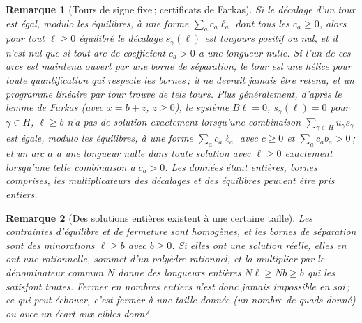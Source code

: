 \documentclass[11pt,a4paper]{article}
\newtheorem{remark}{Remarque}
\newcommand{\shift}{s}
\begin{document}
\begin{remark}[Tours de signe fixe\,; certificats de Farkas]\label{rem:definite}
Si le décalage d'un tour est égal, modulo les équilibres, à une forme $\sum_a
c_a \ell_a$ dont tous les $c_a \ge 0$, alors pour tout $\ell \ge 0$ équilibré
le décalage $\shift_\gamma(\ell)$ est toujours positif ou nul, et il n'est nul
que si tout arc de coefficient $c_a > 0$ a une longueur nulle. Si l'un de ces
arcs est maintenu ouvert par une borne de séparation, le tour est une hélice
pour toute quantification qui respecte les bornes\,; il ne devrait jamais être
retenu, et un programme linéaire par tour trouve de tels tours. Plus
généralement, d'après le lemme de Farkas (avec $x = b + z$, $z \ge 0$), le
système $B\ell = 0$, $\shift_\gamma(\ell) = 0$ pour $\gamma \in H$, $\ell \ge
b$ n'a pas de solution exactement lorsqu'une combinaison $\sum_{\gamma \in H}
u_\gamma \shift_\gamma$ est égale, modulo les équilibres, à une forme $\sum_a
c_a \ell_a$ avec $c \ge 0$ et $\sum_a c_a b_a > 0$\,; et un arc $a$ a une
longueur nulle dans toute solution avec $\ell \ge 0$ exactement lorsqu'une
telle combinaison a $c_a > 0$. Les données étant entières, bornes comprises,
les multiplicateurs des décalages et des équilibres peuvent être pris entiers.
\end{remark}

\begin{remark}[Des solutions entières existent à une certaine taille]\label{rem:exist}
Les contraintes d'équilibre et de fermeture sont homogènes, et les bornes de
séparation sont des minorations $\ell \ge b$ avec $b \ge 0$. Si elles ont une
solution réelle, elles en ont une rationnelle, sommet d'un polyèdre rationnel,
et la multiplier par le dénominateur commun $N$ donne des longueurs entières
$N\ell \ge Nb \ge b$ qui les satisfont toutes. Fermer en nombres entiers n'est
donc jamais impossible en soi\,; ce qui peut échouer, c'est fermer \emph{à une
taille donnée} (un nombre de quads donné) ou avec un écart aux cibles donné.
\end{remark}
\end{document}
